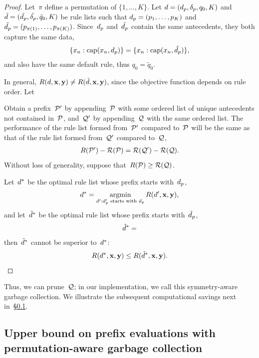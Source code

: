 \begin{proof}
Let~$\pi$ define a permutation of ${\{1, \dots, K\}}$.
%
Let ${{d} = (d_p, \delta_p, q_0, K)}$
and ${\tilde{{d}} = (\tilde{d_p}, \tilde{\delta_p}, \tilde{q}_0, K)}$
be rule lists such that ${d_p = (p_1, \dots, p_K)}$
and ${\tilde{d_p} = (p_{\pi(1)}, \dots, p_{\pi(K)})}$.
%
Since~$d_p$ and~$\tilde{d_p}$ contain the same antecedents,
they both capture the same data,
\begin{align}
\{x_n : \Cap(x_n, \Prefix)\} = \{x_n : \Cap(x_n, \tilde \Prefix)\},
\end{align}
and also have the same default rule, thus ${q_0 = \tilde{q}_0}$.

In general, ${R({d}, \mathbf{x}, \mathbf{y}) \neq R(\tilde{{d}}, \mathbf{x}, \mathbf{y})}$,
since the objective function depends on rule order.
%
Let

Obtain a prefix~$\cal{P}'$ by appending~$\cal{P}$ with some ordered list of
unique antecedents not contained in~$\cal{P}$, and~$\cal{Q}'$ by appending~$\cal{Q}$
with the same ordered list.
%
The performance of the rule list formed from~$\cal{P}'$ compared to~$\cal{P}$ will be
the same as that of the rule list formed from~$\cal{Q}'$ compared to~$\cal{Q}$, \ie
\begin{align}
\Obj(\cal{P}') - \Obj(\cal{P}) = \Obj(\cal{Q}') - \Obj(\cal{Q}).
\end{align}
Without loss of generality, suppose that~${R(\cal{P}) \ge R(\cal{Q})}$.

Let~${d}^*$ be the optimal rule list whose prefix starts with~$d_p$,
\begin{align}
\RL^* = \argmin_{\RL' : \Prefix' \textnormal{ starts with } \Prefix}
\Obj(\RL', \x, \y),
\end{align}
and let~$\tilde {{d}}^*$ be the optimal rule list whose prefix
starts with~$\tilde{d}_p$,
\begin{align}
\tilde \RL^* =
\end{align}
then~$\tilde {{d}}^*$ cannot be superior to~${d}^*$:
\begin{align}
\Obj(\RL^*, \x, \y) \le \Obj(\tilde \RL^*, \x, \y).
\end{align}

\end{proof}

Thus, we can prune~$\cal{Q}$;
in our implementation, we call this symmetry-aware garbage collection.
%
We illustrate the subsequent computational savings next
in~\S\ref{sec:permutation-counting}.

\subsection{Upper bound on prefix evaluations with permutation-aware garbage collection}
\label{sec:permutation-counting}


